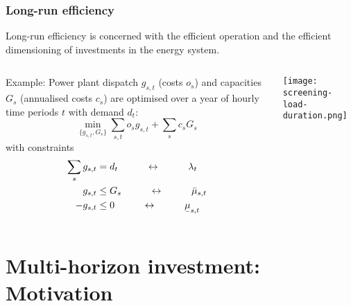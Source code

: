 \documentclass[10pt,aspectratio=169,dvipsnames]{beamer}
\def\l{\lambda}
\def\m{\mu}
\newcommand{\ubar}[1]{\text{\b{$#1$}}}
\begin{document}
\begin{frame}
  \frametitle{Long-run efficiency}


  Long-run efficiency is concerned with the \alert{efficient operation} and \alert{the efficient dimensioning of investments} in the energy system.

  \begin{columns}[T]
    \begin{column}{7.5cm}

      \alert{Example}: Power plant \alert{dispatch} $g_{s,t}$ (costs $o_s$) and \alert{capacities} $G_s$ (annualised costs $c_s$) are optimised over a year of hourly time periods $t$ with demand $d_t$:
      \begin{equation*}
        \min_{\{g_{s,t},G_s\}} \sum_{s,t} o_s g_{s,t} + \sum_s c_s G_s
      \end{equation*}
      with constraints
  \begin{align*}
    \sum_s g_{s,t} & = d_t\hspace{1cm} \leftrightarrow \hspace{1cm} \l_t \\
        g_{s,t}   & \leq  G_s  \hspace{1cm}\leftrightarrow\hspace{1cm} \bar{\m}_{s,t} \\
    - g_{s,t}  & \leq  0  \hspace{1cm}\leftrightarrow\hspace{1cm} \ubar{\m}_{s,t}
  \end{align*}
    \end{column}
    \begin{column}{7cm}

        \texttt{[image: screening-load-duration.png]}

    \end{column}
  \end{columns}

\end{frame}


\section{Multi-horizon investment: Motivation}
\end{document}
